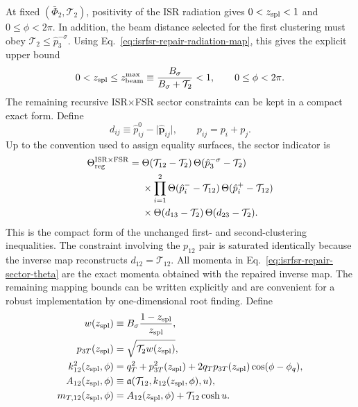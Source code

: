 \documentclass[11pt]{article}
\newcommand{\Ph}{\Phi}
\begin{document}
At fixed $(\bar\Ph_2,\mathcal T_2)$, positivity of the ISR radiation gives
$0<z_{\rm spl}<1$ and $0\le\phi<2\pi$.  In addition, the beam distance selected for the first clustering
must obey $\mathcal T_2\le\hat p_3^{-\sigma}$.  Using
Eq.~\eqref{eq:isrfsr-repair-radiation-map}, this gives the explicit upper bound
\begin{equation}
0<z_{\rm spl}
\le
z_{\rm beam}^{\max}
\equiv
\frac{B_\sigma}{B_\sigma+\mathcal T_2}
<1,
\qquad
0\le\phi<2\pi.
\label{eq:isrfsr-repair-elementary-domain}
\end{equation}
The remaining recursive ISR$\times$FSR sector constraints can be kept in a compact exact form.  Define
\begin{equation}
d_{ij}\equiv
\hat p_{ij}^0-\lvert\hat{\boldsymbol p}_{ij}\rvert,
\qquad
p_{ij}=p_i+p_j.
\label{eq:isrfsr-repair-pair-distances}
\end{equation}
Up to the convention used to assign equality surfaces, the sector indicator is
\begin{align}
\Theta_{\rm reg}^{\rm ISR\times FSR}
={}&
\Theta(\mathcal T_{12}-\mathcal T_2)\,
\Theta(\hat p_3^{-\sigma}-\mathcal T_2)
\nonumber\\
&\times
\prod_{i=1}^{2}
\Theta(\hat p_i^--\mathcal T_{12})\,
\Theta(\hat p_i^+-\mathcal T_{12})
\nonumber\\
&\times
\Theta(d_{13}-\mathcal T_2)\,
\Theta(d_{23}-\mathcal T_2).
\label{eq:isrfsr-repair-sector-theta}
\end{align}
This is the compact form of the unchanged first- and second-clustering inequalities.  The constraint involving
the $p_{12}$ pair is saturated identically because the inverse map reconstructs
$d_{12}=\mathcal T_{12}$.  All momenta in Eq.~\eqref{eq:isrfsr-repair-sector-theta} are the exact momenta
obtained with the repaired inverse map.
The remaining mapping bounds can be written explicitly and are convenient for a robust implementation by
one-dimensional root finding.  Define
\begin{align}
w(z_{\rm spl})
&\equiv
B_\sigma\frac{1-z_{\rm spl}}{z_{\rm spl}},
\nonumber\\
p_{3T}(z_{\rm spl})
&=\sqrt{\mathcal T_2 w(z_{\rm spl})},
\nonumber\\
k_{12}^2(z_{\rm spl},\phi)
&=
q_T^2+p_{3T}^2(z_{\rm spl})
+2q_Tp_{3T}(z_{\rm spl})
\cos(\phi-\phi_q),
\label{eq:isrfsr-repair-domain-kinematics}
\\
A_{12}(z_{\rm spl},\phi)
&\equiv
\mathfrak a(\mathcal T_{12},k_{12}(z_{\rm spl},\phi),u),
\nonumber\\
m_{T,12}(z_{\rm spl},\phi)
&=
A_{12}(z_{\rm spl},\phi)
+\mathcal T_{12}\cosh u.
\label{eq:isrfsr-repair-domain-mt}
\end{align}
\end{document}
